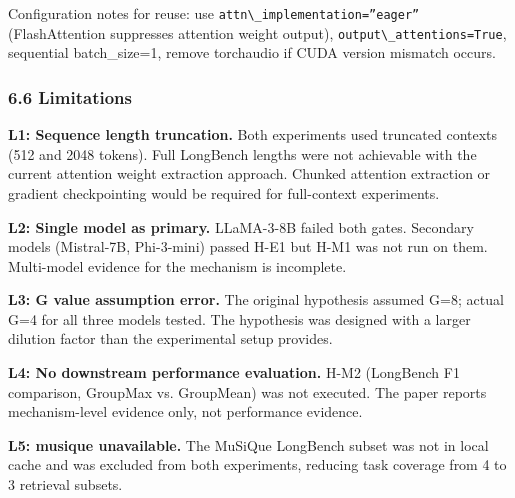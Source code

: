 \begin{table}[htbp]
\centering
{}
\end{table}

Configuration notes for reuse: use \texttt{attn\textbackslash \_implementation=''eager''} (FlashAttention suppresses attention weight output), \texttt{output\textbackslash \_attentions=True}, sequential batch\_size=1, remove torchaudio if CUDA version mismatch occurs.

\subsubsection{6.6 Limitations}

\textbf{L1: Sequence length truncation.} Both experiments used truncated contexts (512 and 2048 tokens). Full LongBench lengths were not achievable with the current attention weight extraction approach. Chunked attention extraction or gradient checkpointing would be required for full-context experiments.

\textbf{L2: Single model as primary.} LLaMA-3-8B failed both gates. Secondary models (Mistral-7B, Phi-3-mini) passed H-E1 but H-M1 was not run on them. Multi-model evidence for the mechanism is incomplete.

\textbf{L3: G value assumption error.} The original hypothesis assumed G=8; actual G=4 for all three models tested. The hypothesis was designed with a larger dilution factor than the experimental setup provides.

\textbf{L4: No downstream performance evaluation.} H-M2 (LongBench F1 comparison, GroupMax vs. GroupMean) was not executed. The paper reports mechanism-level evidence only, not performance evidence.

\textbf{L5: musique unavailable.} The MuSiQue LongBench subset was not in local cache and was excluded from both experiments, reducing task coverage from 4 to 3 retrieval subsets.

